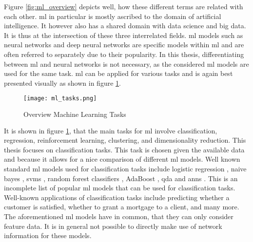 	\noindent Figure \ref{fig:ml_overview} depicts well, how these different
	terms are related with each other. \acs{ml} in particular is
	mostly ascribed to the domain of artificial intelligence. It however also 
	has a shared domain with data science and big data. It is thus at the
	intersection of these three interrelated fields. \acs{ml} models 
	such as neural networks and deep neural networks are specific models within
	\acs{ml} and are often referred to separately due to their popularity. In 
	this thesis, differentiating between \acs{ml} and neural networks is not 
	necessary, as the considered \acs{ml} models are used for the same task. 
	\acs{ml} can be applied for various tasks and is again best 
	presented visually as shown in figure \ref{fig:ml_tasks}.

	\begin{figure}[h]
		\centering
		\texttt{[image: ml\_tasks.png]}
		\caption{Overview Machine Learning Tasks}
		\citep{Artisan2020}
		\label{fig:ml_tasks}
	\end{figure} 

	\noindent It is shown in figure \ref{fig:ml_tasks}, that the main tasks for
	\acs{ml} involve classification, regression, reinforcement
	learning, clustering, and dimensionality reduction. This thesis focuses on 
	classification tasks. This task is chosen given the available data and 
	because it allows for a nice comparison of different \acs{ml} models. 
	Well known standard \acs{ml} models used for classification tasks 
	include logistic regression \citep{cramer2002origins}, naive bayes 
	\citep{zhang2004bayes}, \acp{svm} \citep{platt1999probabilistic}, 
	random forest classifiers \citep{breiman2001random}, AdaBoost 
	\citep{freund1997decision}, \ac{qda} \citep{tharwat2016linear} and 
	\acp{ann} \citep{mcculloch1943logical,werbos1974beyond}. This is an 
	incomplete list of popular \acs{ml} models that can be used for 
	classification tasks. Well-known applications of classification tasks include 
	predicting whether a customer is satisfied, whether to grant a mortgage to 
	a client, and many more. The aforementioned \acs{ml} models have in 
	common, that they can only consider feature data. It is in general not 
	possible to directly make use of network information for these models. \\

